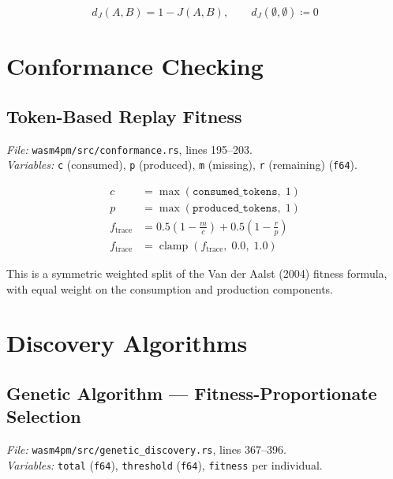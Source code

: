 \documentclass[11pt,a4paper]{article}
\begin{document}
\begin{equation}
  d_J(A,B) = 1 - J(A,B), \qquad
  d_J(\emptyset,\emptyset) \coloneqq 0
\end{equation}

\section{Conformance Checking}

\subsection{Token-Based Replay Fitness}
\textit{File:} \texttt{wasm4pm/src/conformance.rs}, lines 195--203.\\
\textit{Variables:} \texttt{c} (consumed), \texttt{p} (produced), \texttt{m} (missing), \texttt{r} (remaining) (\texttt{f64}).

\begin{align}
  c &= \max(\texttt{consumed\_tokens},\; 1) \\
  p &= \max(\texttt{produced\_tokens},\; 1) \\[6pt]
  f_\text{trace} &= 0.5\left(1 - \frac{m}{c}\right) + 0.5\left(1 - \frac{r}{p}\right) \\[6pt]
  f_\text{trace} &= \operatorname{clamp}(f_\text{trace},\; 0.0,\; 1.0)
\end{align}

This is a symmetric weighted split of the Van der Aalst (2004) fitness formula, with equal weight on the consumption and production components.

\section{Discovery Algorithms}

\subsection{Genetic Algorithm — Fitness-Proportionate Selection}
\textit{File:} \texttt{wasm4pm/src/genetic\_discovery.rs}, lines 367--396.\\
\textit{Variables:} \texttt{total} (\texttt{f64}), \texttt{threshold} (\texttt{f64}), \texttt{fitness} per individual.
\end{document}
